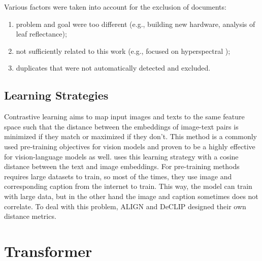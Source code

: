 Various factors were taken into account for the exclusion of documents:
\begin{enumerate}
    \item problem and goal were too different (e.g., building new hardware, analysis of leaf reflectance);
    \item not sufficiently related to this work (e.g., focused on hyperspectral );
    \item duplicates that were not automatically detected and excluded.
\end{enumerate}


\subsection{Learning Strategies}
Contrastive learning aims to map input images and texts to the same feature space such that the distance between the embeddings of image-text pairs is minimized if they match or maximized if they don’t. This method is a commonly used pre-training objectives for vision models and proven to be a highly effective for vision-language models as well. \cite{radford2021learning} uses this learning strategy with a cosine distance between the text and image embeddings. For pre-training methods requires large datasets to train, so most of the times, they use image and corresponding caption from the internet to train. This way, the model can train with large data, but in the other hand the image and caption sometimes does not correlate. To deal with this problem, ALIGN\cite{jia2021scaling} and DeCLIP\cite{li2022supervision} designed their own distance metrics.

\section{Transformer}


